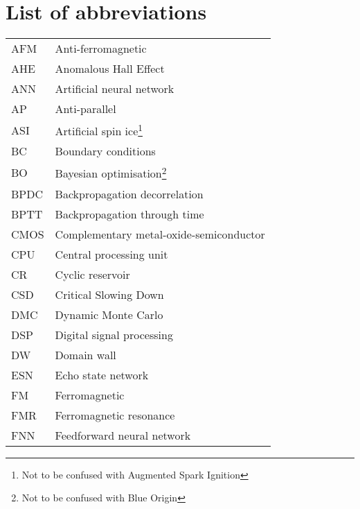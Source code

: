 \chapter{List of abbreviations}
{
    \addtolength{\skip\footins}{1pc}
    \begin{longtable}[l]{ll}
        AFM   & Anti-ferromagnetic                          \\
        AHE   & Anomalous Hall Effect                       \\
        ANN   & Artificial neural network                   \\
        AP    & Anti-parallel                               \\
        ASI   & Artificial spin ice\footnote{Not to be confused with Augmented Spark Ignition} \\
        BC    & Boundary conditions                         \\
        BO    & Bayesian optimisation\footnote{Not to be confused with Blue Origin} \\
        BPDC  & Backpropagation decorrelation               \\
        BPTT  & Backpropagation through time                \\
        CMOS  & Complementary metal-oxide-semiconductor     \\
        CPU   & Central processing unit                     \\
        CR    & Cyclic reservoir                            \\
        CSD   & Critical Slowing Down                       \\
        DMC   & Dynamic Monte Carlo                         \\
        DSP   & Digital signal processing                   \\
        DW    & Domain wall                                 \\
        ESN   & Echo state network                          \\
        FM    & Ferromagnetic                               \\
        FMR   & Ferromagnetic resonance                     \\ %
        FNN   & Feedforward neural network                  \\

\end{longtable}}
